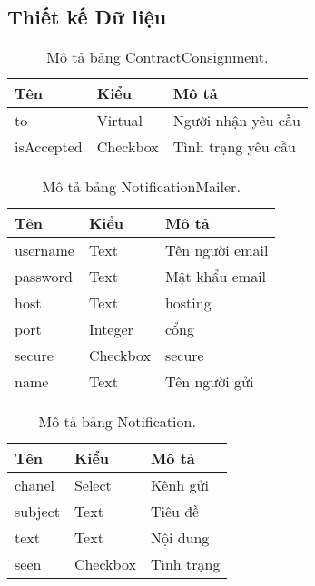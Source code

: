 \subsection{Thiết kế Dữ liệu}
\FloatBarrier
	\begin{table}[h!]
		\begin{center}
			\caption{Mô tả bảng ContractConsignment.}
			\label{table:ContractConsignment}
			\begin{tabularx}{0.6\textwidth}{ |l|l|X| } 
				\hline
				Tên & Kiểu & Mô tả \\
				\hline
				to & Virtual & Người nhận yêu cầu \\
				isAccepted & Checkbox & Tình trạng yêu cầu \\
				\hline
			\end{tabularx}
		\end{center}
	\end{table}
	
	\begin{table}[h!]
		\begin{center}
			\caption{Mô tả bảng NotificationMailer.}
			\begin{tabularx}{0.6\textwidth}{ |l|l|X| } 
				\hline
				Tên & Kiểu & Mô tả \\
				\hline
				username & Text & Tên người email \\
				password & Text & Mật khẩu email \\
				host & Text & hosting \\
				port & Integer & cổng \\
				secure & Checkbox & secure \\
				name & Text & Tên người gửi \\ 
				\hline
			\end{tabularx}
			\label{table:NotificationMailer}
		\end{center}
	\end{table}
	
	
	\begin{table}[h!]
		\begin{center}
			\caption{Mô tả bảng Notification.}
			\begin{tabularx}{0.6\textwidth}{ |l|l|X| } 
				\hline
				Tên & Kiểu & Mô tả \\
				\hline
				chanel & Select & Kênh gửi \\
				subject & Text & Tiêu đề \\
				text & Text & Nội dung \\
				seen & Checkbox & Tình trạng \\ 
				\hline
			\end{tabularx}
			\label{table:Notification}
		\end{center}
	\end{table}
	
